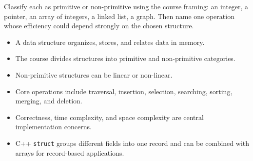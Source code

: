 \begin{quickcheck}
Classify each as primitive or non-primitive using the course framing: an integer, a pointer, an array of integers, a linked list, a graph. Then name one operation whose efficiency could depend strongly on the chosen structure.
\end{quickcheck}

\begin{chapterrecap}
\begin{itemize}
  \item A data structure organizes, stores, and relates data in memory.
  \item The course divides structures into primitive and non-primitive categories.
  \item Non-primitive structures can be linear or non-linear.
  \item Core operations include traversal, insertion, selection, searching, sorting, merging, and deletion.
  \item Correctness, time complexity, and space complexity are central implementation concerns.
  \item C++ \texttt{struct} groups different fields into one record and can be combined with arrays for record-based applications.
\end{itemize}
\end{chapterrecap}


